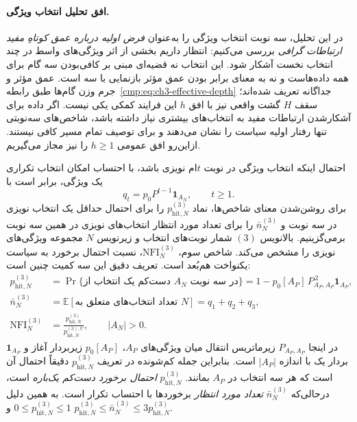 \paragraph{افق تحلیل انتخاب ویژگی.}
در این تحلیل، سه نوبت انتخاب ویژگی را
به‌عنوان \emph{فرض اولیه درباره عمق کوتاهِ مفید
ارتباطات گرافی} بررسی می‌کنیم: انتظار داریم
بخشی از اثر ویژگی‌های واسط در چند انتخاب نخست
آشکار شود. این انتخاب نه قضیه‌ای مبنی بر کافی‌بودن
سه گام برای همه داده‌هاست و نه به معنای برابر بودن
عمق مؤثر بازنمایی با سه است. عمق مؤثر و جرم
وزن گام‌ها طبق رابطه~\eqref{cmp:eq:ch3-effective-depth}
جداگانه تعریف شده‌اند؛ سقف $H$ گشت واقعی نیز
با افق $h$ این فرایند کمکی یکی نیست.
اگر داده برای آشکارشدن ارتباطات مفید به
انتخاب‌های بیشتری نیاز داشته باشد،
شاخص‌های سه‌نوبتی تنها رفتار اولیه سیاست را
نشان می‌دهند و برای توصیف تمام مسیر کافی نیستند.
ازاین‌رو افق عمومی $h\ge1$ را نیز مجاز می‌گیریم.

احتمال اینکه انتخاب ویژگی در نوبت $t$ام نویزی باشد،
با احتساب امکان انتخاب تکراری یک ویژگی، برابر است با
\begin{equation}\label{cmp:eq:ch3-noise-qt}
q_t=p_0P^{t-1}\mathbf 1_{A_N},\qquad t\ge1.
\end{equation}
برای روشن‌شدن معنای شاخص‌ها، نماد
$p_{\mathrm{hit},N}^{(3)}$ را برای احتمال حداقل
یک انتخاب نویزی در سه نوبت و
$\bar n_N^{(3)}$ را برای تعداد مورد انتظار
انتخاب‌های نویزی در همین سه نوبت برمی‌گزینیم.
بالانویس $(3)$ شمار نوبت‌های انتخاب و زیرنویس $N$
مجموعه ویژگی‌های نویزی را مشخص می‌کند.
شاخص سوم، $\mathrm{NFI}_N^{(3)}$،
نسبت احتمال برخورد به سیاست یکنواخت
هم‌بُعد است. تعریف دقیق این سه کمیت چنین است:
\begin{equation}\label{cmp:eq:ch3-noise-F3-E3}
\boxed{
\begin{aligned}
p_{\mathrm{hit},N}^{(3)}&=\Pr\{\text{دست‌کم یک انتخاب از }A_N\text{ در سه نوبت}\}
   =1-p_0[A_P]\,P_{A_P,A_P}^{\,2}\mathbf 1_{A_P},\\
\bar n_N^{(3)}&=\mathbb E[\text{تعداد انتخاب‌های متعلق به }N]
   =q_1+q_2+q_3,\\
\mathrm{NFI}_N^{(3)}&=\frac{p_{\mathrm{hit},N}^{(3)}}{p_{\mathrm{hit},N}^{(3),U}},\qquad |A_N|>0.
\end{aligned}}
\end{equation}
در اینجا $P_{A_P,A_P}$ زیرماتریس
انتقال میان ویژگی‌های $A_P$،
$p_0[A_P]$ زیر‌بردار آغاز
و $\mathbf 1_{A_P}$ بردار یک
با اندازه $|A_P|$ است.
بنابراین جمله کم‌شونده در تعریف
$p_{\mathrm{hit},N}^{(3)}$ دقیقاً
احتمال آن است که هر سه انتخاب در $A_P$ بمانند.
$p_{\mathrm{hit},N}^{(3)}$ \emph{احتمال برخورد دست‌کم یک‌باره} است،
درحالی‌که $\bar n_N^{(3)}$ \emph{تعداد مورد انتظار} برخوردها
با احتساب تکرار است. به همین دلیل
$0\le p_{\mathrm{hit},N}^{(3)}\le1$ و
$p_{\mathrm{hit},N}^{(3)}\le\bar n_N^{(3)}
\le3p_{\mathrm{hit},N}^{(3)}$.

